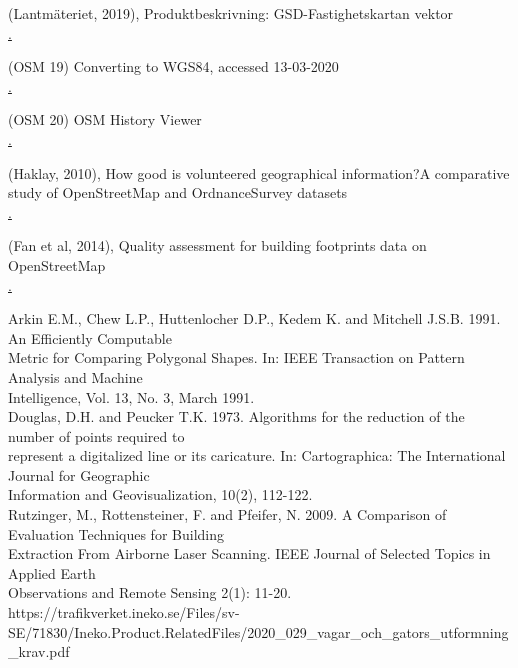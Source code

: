 \documentclass[a4paper]{article}
\begin{document}
\begin{thebibliography}{9}

(Lantmäteriet, 2019), Produktbeskrivning: GSD-Fastighetskartan vektor \\ 
\href{https://www.lantmateriet.se/globalassets/kartor-och-geografisk-information/kartor/fastshmi.pdf}.

(OSM 19) Converting to WGS84, accessed 13-03-2020 \\ 
\href{https://wiki.openstreetmap.org/wiki/Converting\_to\_WGS84}.

(OSM 20) OSM History Viewer\\
\href{https://wiki.openstreetmap.org/wiki/OSM\_History\_Viewer}.

(Haklay, 2010), How good is volunteered geographical information?A comparative study of OpenStreetMap and OrdnanceSurvey datasets \\
\href{https://kfrichter.org/crowdsourcing-material/day1/haklay10.pdf}.

(Fan et al, 2014), Quality assessment for building footprints data on OpenStreetMap \\
\href{https://www.researchgate.net/publication/262163378\_Quality\_assessment\_for\_building\_footprints\_data\_on\_OpenStreetMap}.

Arkin E.M., Chew L.P., Huttenlocher D.P., Kedem K. and Mitchell J.S.B. 1991. An Efficiently Computable \\
Metric for Comparing Polygonal Shapes. In: IEEE Transaction on Pattern Analysis and Machine \\
Intelligence, Vol. 13, No. 3, March 1991. \\

Douglas, D.H. and Peucker T.K. 1973. Algorithms for the reduction of the number of points required to \\
represent a digitalized line or its caricature. In: Cartographica: The International Journal for Geographic \\
Information and Geovisualization, 10(2), 112-122. \\

Rutzinger, M., Rottensteiner, F. and Pfeifer, N. 2009. A Comparison of Evaluation Techniques for Building \\
Extraction From Airborne Laser Scanning. IEEE Journal of Selected Topics in Applied Earth \\
Observations and Remote Sensing 2(1): 11-20. \\

https://trafikverket.ineko.se/Files/sv-SE/71830/Ineko.Product.RelatedFiles/2020\_029\_vagar\_och\_gators\_utformning\_krav.pdf \\

\end{thebibliography}
\end{document}
